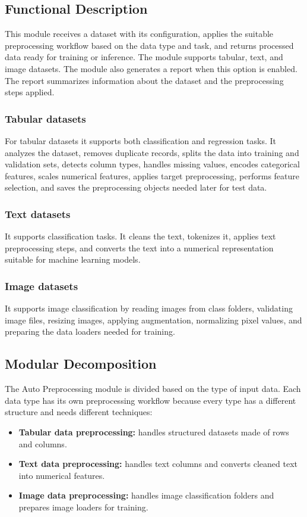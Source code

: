 \documentclass[12pt,a4paper]{report}
\begin{document}
\subsection{Functional Description}
\noindent This module receives a dataset with its configuration, applies the suitable preprocessing workflow based on the data type and task, and returns processed data ready for training or inference. The module supports tabular, text, and image datasets.
\noindent The module also generates a report when this option is enabled. The report
summarizes information about the dataset and the preprocessing steps applied.

\subsubsection{Tabular datasets}
\noindent For tabular datasets it supports both classification and regression
tasks. It analyzes the dataset, removes duplicate records, splits the data into
training and validation sets, detects column types, handles missing values,
encodes categorical features, scales numerical features, applies target
preprocessing, performs feature selection, and saves the preprocessing objects
needed later for test data.
\subsubsection{Text datasets}
\noindent It supports classification tasks. It cleans the text,
tokenizes it, applies text preprocessing steps, and converts the text into a
numerical representation suitable for machine learning models.
\subsubsection{Image datasets}
\noindent It supports image classification by reading images from class
folders, validating image files, resizing images, applying augmentation, normalizing pixel values, and
preparing the data loaders needed for training.


\subsection{Modular Decomposition}
\noindent The Auto Preprocessing module is divided based on the type of input
data. Each data type has its own preprocessing workflow because every type has a
different structure and needs different techniques:

\begin{itemize}
    \item \textbf{Tabular data preprocessing:} handles structured datasets made
    of rows and columns.
    \item \textbf{Text data preprocessing:} handles text columns and converts
    cleaned text into numerical features.
    \item \textbf{Image data preprocessing:} handles image classification
    folders and prepares image loaders for training.
\end{itemize}
\end{document}
